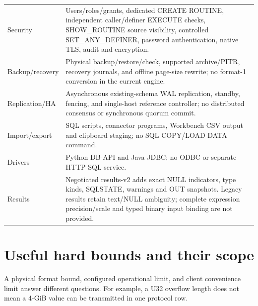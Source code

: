 \begin{longtable}{p{.27\linewidth}p{.64\linewidth}}
Security & Users/roles/grants, dedicated CREATE ROUTINE, independent caller/definer EXECUTE checks, SHOW\_ROUTINE source visibility, controlled SET\_ANY\_DEFINER, password authentication, native TLS, audit and encryption. \\
Backup/recovery & Physical backup/restore/check, supported archive/PITR, recovery journals, and offline page-size rewrite; no format-1 conversion in the current engine. \\
Replication/HA & Asynchronous existing-schema WAL replication, standby, fencing, and single-host reference controller; no distributed consensus or synchronous quorum commit. \\
Import/export & SQL scripts, connector programs, Workbench CSV output and clipboard staging; no SQL COPY/LOAD DATA command. \\
Drivers & Python DB-API and Java JDBC; no ODBC or separate HTTP SQL service. \\
Results & Negotiated results-v2 adds exact NULL indicators, type kinds, SQLSTATE, warnings and OUT snapshots. Legacy results retain text/NULL ambiguity; complete expression precision/scale and typed binary input binding are not provided. \\
\bottomrule
\end{longtable}


\section{Useful hard bounds and their scope}

A physical format bound, configured operational limit, and client convenience limit answer different questions. For example, a U32 overflow length does not mean a 4-GiB value can be transmitted in one protocol row.

